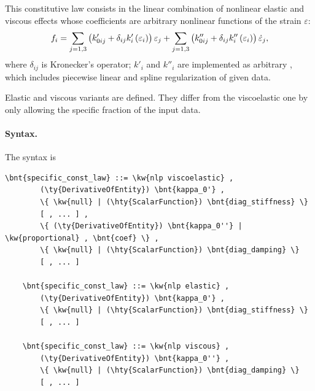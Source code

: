 This constitutive law consists in the linear combination
of nonlinear elastic and viscous effects whose coefficients
are arbitrary nonlinear functions of the strain $\varepsilon$:
\begin{equation}
	f_i = \sum_{j=1,3} \left( 
		k'_{0ij} + \delta_{ij} k_i'\left( \varepsilon_i \right)
	 \right) \varepsilon_j
	+ \sum_{j=1,3} \left( 
		k''_{0ij} + \delta_{ij} k''_i\left( \varepsilon_i \right)
	 \right) \dot{\varepsilon}_j ,
	\label{eq:nlp-cl}
\end{equation}
where $\delta_{ij}$ is Kronecker's operator;
$k'_i$ and $k''_i$ are implemented as arbitrary
,
which includes piecewise linear and spline regularization
of given data.

Elastic and viscous variants are defined.
They differ from the viscoelastic one by only allowing
the specific fraction of the input data.

\paragraph{Syntax.}
The syntax is
\begin{Verbatim}[commandchars=\\\{\}]
    \bnt{specific_const_law} ::= \kw{nlp viscoelastic} ,
        (\ty{DerivativeOfEntity}) \bnt{kappa_0'} ,
        \{ \kw{null} | (\hty{ScalarFunction}) \bnt{diag_stiffness} \}
        [ , ... ] ,
        \{ (\ty{DerivativeOfEntity}) \bnt{kappa_0''} | \kw{proportional} , \bnt{coef} \} ,
        \{ \kw{null} | (\hty{ScalarFunction}) \bnt{diag_damping} \}
        [ , ... ]

    \bnt{specific_const_law} ::= \kw{nlp elastic} ,
        (\ty{DerivativeOfEntity}) \bnt{kappa_0'} ,
        \{ \kw{null} | (\hty{ScalarFunction}) \bnt{diag_stiffness} \}
        [ , ... ]

    \bnt{specific_const_law} ::= \kw{nlp viscous} ,
        (\ty{DerivativeOfEntity}) \bnt{kappa_0''} ,
        \{ \kw{null} | (\hty{ScalarFunction}) \bnt{diag_damping} \}
        [ , ... ]
\end{Verbatim}

